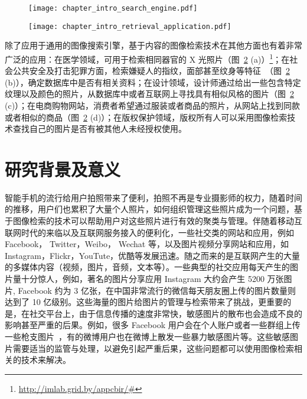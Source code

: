 \begin{figure}[!t]
\centering
\texttt{[image: chapter\_intro\_search\_engine.pdf]}
\label{fig:image_search_engine}
\end{figure}

\begin{figure}[!t]
\centering
\texttt{[image: chapter\_intro\_retrieval\_application.pdf]}
\label{fig:image_retrieval_application}
\end{figure}

除了应用于通用的图像搜索引擎，基于内容的图像检索技术在其他方面也有着非常广泛的应用：在医学领域，可用于检索相同器官的 X 光照片（图~\ref{fig:image_retrieval_application} (a)）\footnote{\url{http://imlab.grid.by/appcbir/#}}；在社会公共安全及打击犯罪方面，检索嫌疑人的指纹，面部甚至纹身等特征~\cite{Lee2012ImageRI}（图~\ref{fig:image_retrieval_application} (b)），确定数据库中是否有相关资料；在设计领域，设计师通过给出一些包含特定纹理以及颜色的照片，从数据库中或者互联网上寻找具有相似风格的图片（图~\ref{fig:image_retrieval_application} (c)）；在电商购物网站，消费者希望通过服装或者商品的照片，从网站上找到同款或者相似的商品（图~\ref{fig:image_retrieval_application} (d)）；在版权保护领域，版权所有人可以采用图像检索技术查找自己的图片是否有被其他人未经授权使用。

\section{研究背景及意义}
智能手机的流行给用户拍照带来了便利，拍照不再是专业摄影师的权力，随着时间的推移，用户们也累积了大量个人照片，如何组织管理这些照片成为一个问题，基于图像检索的技术可以帮助用户对这些照片进行有效的聚类与管理。伴随着移动互联网时代的来临以及互联网服务接入的便利化，一些社交类的网站和应用，例如 Facebook， Twitter，Weibo， Wechat 等，以及图片视频分享网站和应用，如 Instagram，Flickr，YouTute，优酷等发展迅速。随之而来的是互联网产生的大量的多媒体内容（视频，图片，音频，文本等）。一些典型的社交应用每天产生的图片量十分惊人，例如，著名的图片分享应用 Instagram 大约会产生 5200 万张图片, Facebook 约为 3 亿张，在中国非常流行的微信每天朋友圈上传的图片数量则达到了 10 亿级别。这些海量的图片给图片的管理与检索带来了挑战，更重要的是，在社交平台上，由于信息传播的速度非常快，敏感图片的散布也会造成不良的影响甚至严重的后果。例如，很多 Facebook 用户会在个人账户或者一些群组上传一些枪支图片~\cite{Drange2016,MELE2016FacebookBG}，有的微博用户也在微博上散发一些暴力敏感图片等。这些敏感图片需要适当的监管与处理，以避免引起严重后果，这些问题都可以使用图像检索相关的技术来解决。

